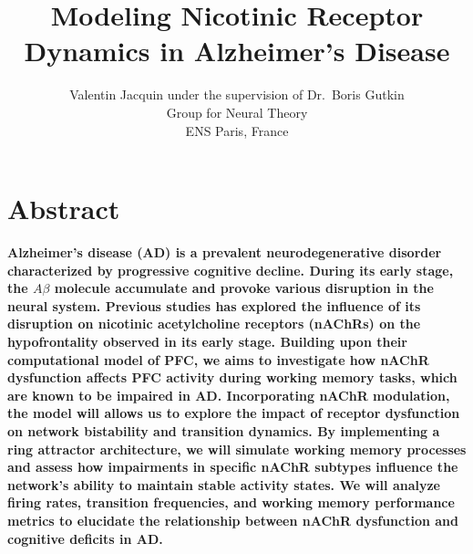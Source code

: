 \documentclass[10pt,letterpaper]{article}
\title{Modeling Nicotinic Receptor Dynamics in Alzheimer's Disease}
\author{
Valentin Jacquin under the supervision of Dr.\ Boris Gutkin \\
Group for Neural Theory \\
ENS Paris, France \\
}
\begin{document}
\maketitle

\section{Abstract}
{\bf
Alzheimer's disease (AD) is a prevalent neurodegenerative disorder characterized by progressive cognitive decline. During its early stage, the $A\beta$ molecule accumulate and provoke various disruption in the neural system. Previous studies has explored the influence of its disruption on nicotinic acetylcholine receptors (nAChRs) on the hypofrontality observed in its early stage. Building upon their computational model of PFC, we aims to investigate how nAChR dysfunction affects PFC activity during working memory tasks, which are known to be impaired in AD. Incorporating nAChR modulation, the model will allows us to explore the impact of receptor dysfunction on network bistability and transition dynamics. By implementing a ring attractor architecture, we will simulate working memory processes and assess how impairments in specific nAChR subtypes influence the network's ability to maintain stable activity states. We will analyze firing rates, transition frequencies, and working memory performance metrics to elucidate the relationship between nAChR dysfunction and cognitive deficits in AD.
}
\end{document}
